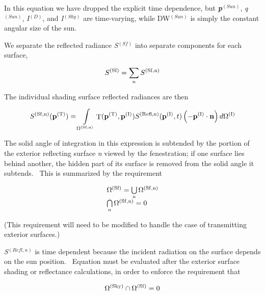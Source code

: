 In this equation we have dropped the explicit time dependence, but \textbf{\emph{p}}\(^{(Sun)}\), \emph{q}\(^{(Sun)}\), \emph{I}\(^{(D)}\), and \emph{I}\(^{(Sky)}\) are time-varying, while DW\(^{(Sun)}\) is simply the constant angular size of the sun.

We separate the reflected radiance \emph{S}\(^{(Sf)}\) into separate components for each surface,

\begin{equation}
{S^{{\rm{(Sf)}}}} = \sum\limits_n {{S^{{\rm{(Sf, n)}}}}}
\end{equation}

The individual shading surface reflected radiances are then

\begin{equation}
{S^{{\rm{(Sf, n)}}}}({{\bf{p}}^{{\rm{(T)}}}}) = \int\limits_{{\Omega ^{{\rm{(Sf, n)}}}}} {{\mathop{\rm T}\nolimits} ({{\bf{p}}^{{\rm{(T)}}}},{{\bf{p}}^{{\rm{(I)}}}}){S^{{\rm{(Refl, n)}}}}({{\bf{p}}^{{\rm{(I)}}}},t)\left( { - {{\bf{p}}^{{\rm{(I)}}}}\cdot {\bf{n}}} \right)d{\Omega ^{{\rm{(I)}}}}}
\end{equation}

The solid angle of integration in this expression is subtended by the portion of the exterior reflecting surface \emph{n} viewed by the fenestration; if one surface lies behind another, the hidden part of its surface is removed from the solid angle it subtends.~ This is summarized by the requirement

\begin{equation}
\begin{array}{l}{\Omega ^{{\rm{(Sf)}}}} = \bigcup\limits_n {{\Omega ^{{\rm{(Sf, n)}}}}} \\\bigcap\limits_n {{\Omega ^{{\rm{(Sf, n)}}}}}  = 0\end{array}
\end{equation}

(This requirement will need to be modified to handle the case of transmitting exterior surfaces.)

\emph{S}\(^{(Refl,n)}\) is time dependent because the incident radiation on the surface depends on the sun position. \emph{~}Equation must be evaluated after the exterior surface shading or reflectance calculations, in order to enforce the requirement that

\begin{equation}
{\Omega ^{{\rm{(Sky)}}}} \cap {\Omega ^{{\rm{(Sf)}}}} = 0
\end{equation}

